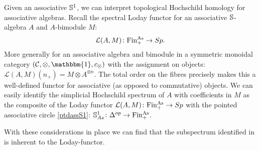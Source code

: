 Given an associative $\S^1$, we can interpret topological Hochschild homology
for associative algebras. Recall the spectral
Loday functor for an associative $\S$-algebra $A$ and $A$-bimodule $M$:
\[\mathcal{L}(A,M)\colon \Fia\rightarrow Sp.\]
More generally for an associative algebra and bimodule in a 
symmetric monoidal category $(\C,\otimes,\mathbbm{1},c_\otimes)$ with
the assignment on objects: $\mathcal{L}(A,M)(n_+)=M\otimes A^{\otimes n}$.
The total order on the fibres precisely makes this a well-defined functor
for associative (as opposed to commutative) objects. We can easily identify
the simplicial Hochschild spectrum of $A$ with coefficients in $M$ 
as the composite of the Loday functor $\mathcal{L}(A,M)\colon \Fia\rightarrow Sp$
with the pointed associative circle \ref{ptdassS1}: $\S^1_{As}\colon \Delta^{op}
\rightarrow \Fia$.

{}

With these considerations in place we can find that the subspectrum
identified in \cite[Section 3]{MS} is inherent to the Loday-functor.

